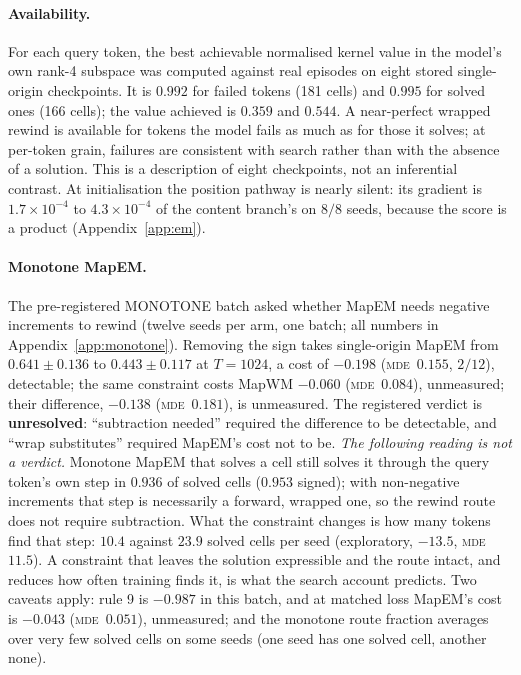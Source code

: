 \documentclass[10pt]{article}
\newcommand{\mde}{\textsc{mde}}
\begin{document}
\paragraph{Availability.} For each query token, the best achievable normalised kernel value in the model's
own rank-4 subspace was computed against real episodes on eight stored single-origin checkpoints. It is
$0.992$ for failed tokens (181 cells) and $0.995$ for solved ones (166 cells); the value achieved is $0.359$
and $0.544$. A near-perfect wrapped rewind is available for tokens the model fails as much as for those it
solves; at per-token grain, failures are consistent with search rather than with the absence of a solution. This is a description of eight checkpoints, not an
inferential contrast. At initialisation the position pathway is nearly silent: its gradient is $1.7\times
10^{-4}$ to $4.3\times10^{-4}$ of the content branch's on $8/8$ seeds, because the score is a product
(Appendix~\ref{app:em}). %

\paragraph{Monotone MapEM.} The pre-registered MONOTONE batch asked whether MapEM needs negative increments
to rewind (twelve seeds per arm, one batch; all numbers in Appendix~\ref{app:monotone}). Removing the
sign takes single-origin MapEM from $0.641\pm0.136$ to $0.443\pm0.117$ at $T=1024$, a cost of $-0.198$ (\mde\ $0.155$, $2/12$), detectable; the same constraint costs
MapWM $-0.060$ (\mde\ $0.084$), unmeasured; their difference, $-0.138$ (\mde\ $0.181$), is unmeasured. The
registered verdict is \textbf{unresolved}: ``subtraction needed'' required the difference to be detectable,
and ``wrap substitutes'' required MapEM's cost not to be. \emph{The following reading is not a verdict.}
Monotone MapEM that solves a cell still solves it through the query token's own step in $0.936$ of solved
cells ($0.953$ signed); with non-negative increments that step is necessarily a forward, wrapped one, so the
rewind route does not require subtraction. What the constraint changes is how many tokens find that step:
$10.4$ against $23.9$ solved cells per seed (exploratory, $-13.5$, \mde\ $11.5$). A constraint that leaves
the solution expressible and the route intact, and reduces how often training finds it, is what the search
account predicts. Two caveats apply: rule 9 is $-0.987$ in this batch, and at matched loss MapEM's cost is
$-0.043$ (\mde\ $0.051$), unmeasured; and the monotone route fraction averages over very few solved cells on
some seeds (one seed has one solved cell, another none). %
\end{document}
